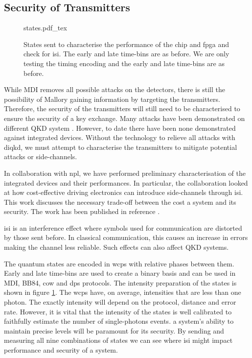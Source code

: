 \subsection{Security of Transmitters}

\begin{figure}[t]
	\centering
	\def\svgwidth{0.9\textwidth} 
	{states.pdf_tex}
	\caption[States sent for ISI calibration]{States sent to characterise the performance of the chip and \ac{fpga} and check for \ac{isi}. The early and late time-bins are as before. We are only testing the timing encoding and the early and late time-bins are as before.}
	\label{fig:isi_states}
\end{figure}

While \ac{MDI} removes all possible attacks on the detectors, there is still the possibility of Mallory gaining information by targeting the transmitters. Therefore, the security of the transmitters will still need to be characterised to ensure the security of a key exchange. Many attacks have been demonstrated on different \ac{QKD} system \cite{makarov2019}. However, to date there have been none demonstrated against integrated devices. Without the technology to relieve all attacks with \ac{diqkd}, we must attempt to characterise the transmitters to mitigate potential attacks or side-channels.

In collaboration with \ac{npl}, we have performed preliminary characterisation of the integrated devices and their performances. In particular, the collaboration looked at how cost-effective driving electronics can introduce side-channels through \ac{isi}. This work discusses the necessary trade-off between the cost a system and its security. The work has been published in reference \cite{vaquero2018}.

\Ac{isi} is an interference effect where symbols used for communication are distorted by those sent before. In classical communication, this causes an increase in errors making the channel less reliable. Such effects can also affect \ac{QKD} systems.


The quantum states are encoded in \acp{wcp} with relative phases between them. Early and late time-bins are used to create a binary basis and can be used in \ac{MDI}, BB84, \ac{cow} and \ac{dps} protocols. The intensity preparation of the states is shown in figure \ref{fig:isi_states}. The \acp{wcp} have, on average, intensities that are less than one photon. The exactly intensity will depend on the protocol, distance and error rate. However, it is vital that the intensity of the states is well calibrated to faithfully estimate the number of single-photons events. a system's ability to maintain precise levels will be paramount for its security. By sending and measuring all nine combinations of states we can see where \ac{isi} might impact performance and security of a system.

